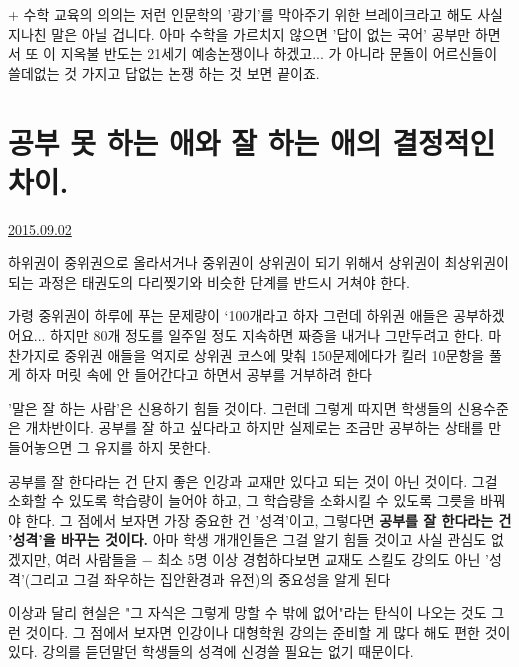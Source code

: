 + 수학 교육의 의의는 저런 인문학의 '광기'를 막아주기 위한 브레이크라고 해도 사실 지나친 말은 아닐 겁니다.
아마 수학을 가르치지 않으면 '답이 없는 국어' 공부만 하면서 또 이 지옥불 반도는 21세기 예송논쟁이나 하겠고... 가 아니라
문돌이 어르신들이 쓸데없는 것 가지고 답없는 논쟁 하는 것 보면 끝이죠.
\vspace{5mm}








\section{공부 못 하는 애와 잘 하는 애의 결정적인 차이.}
\href{https://www.kockoc.com/Apoc/284872}{2015.09.02}

\vspace{5mm}

하위권이 중위권으로 올라서거나 중위권이 상위권이 되기 위해서
상위권이 최상위권이 되는 과정은 태권도의 다리찢기와 비슷한 단계를 반드시 거쳐야 한다.
\vspace{5mm}

가령 중위권이 하루에 푸는 문제량이 `100개라고 하자
그런데 하위권 애들은 공부하겠어요... 하지만 80개 정도를 일주일 정도 지속하면 짜증을 내거나 그만두려고 한다.
마찬가지로 중위권 애들을 억지로 상위권 코스에 맞춰 150문제에다가 킬러 10문항을 풀게 하자
머릿 속에 안 들어간다고 하면서 공부를 거부하려 한다
\vspace{5mm}

'말은 잘 하는 사람'은 신용하기 힘들 것이다.
그런데 그렇게 따지면 학생들의 신용수준은 개차반이다.
공부를 잘 하고 싶다라고 하지만 실제로는 조금만 공부하는 상태를 만들어놓으면 그 유지를 하지 못한다.
\vspace{5mm}

공부를 잘 한다라는 건 단지 좋은 인강과 교재만 있다고 되는 것이 아닌 것이다.
그걸 소화할 수 있도록 학습량이 늘어야 하고, 그 학습량을 소화시킬 수 있도록 그릇을 바꿔야 한다.
그 점에서 보자면 가장 중요한 건 '성격'이고, 그렇다면 \textbf{공부를 잘 한다라는 건 '성격'을 바꾸는 것이다.}
아마 학생 개개인들은 그걸 알기 힘들 것이고 사실 관심도 없겠지만,
여러 사람들을 $-$ 최소 5명 이상 경험하다보면 교재도 스킬도 강의도 아닌 '성격'(그리고 그걸 좌우하는 집안환경과 유전)의 중요성을 알게 된다
\vspace{5mm}

이상과 달리 현실은 "그 자식은 그렇게 망할 수 밖에 없어"라는 탄식이 나오는 것도 그런 것이다.
그 점에서 보자면 인강이나 대형학원 강의는 준비할 게 많다 해도 편한 것이 있다. 강의를 듣던말던 학생들의 성격에 신경쓸 필요는 없기 때문이다.
\vspace{5mm}

